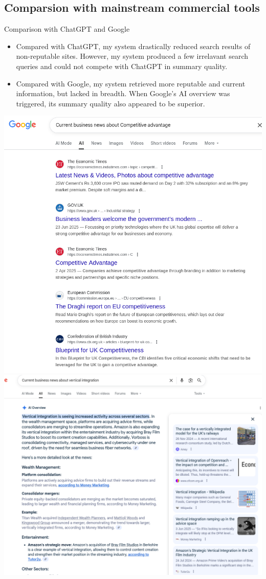 \documentclass{beamer}
\begin{document}
\subsection{Comparsion with mainstream commercial tools}
\begin{frame}{Comparison with ChatGPT and Google}
\begin{itemize}
	\item Compared with ChatGPT, my system drastically reduced search
		results of non-reputable sites. However, my system produced a few
		irrelavant search queries and could not compete with ChatGPT in summary
		quality. 
	\item Compared with Google, my system retrieved more reputable and current
		information, but lacked in breadth. When Google's AI overview was
		triggered, its summary quality also appeared to be superior.
\end{itemize}
\begin{center}
	\includegraphics[height=.4\textheight]{../../deliverables/thesis/res/google_res1.png}
	\includegraphics[height=.4\textheight]{../../deliverables/thesis/res/google_res2.png}

\end{center}
\end{frame}
\end{document}
